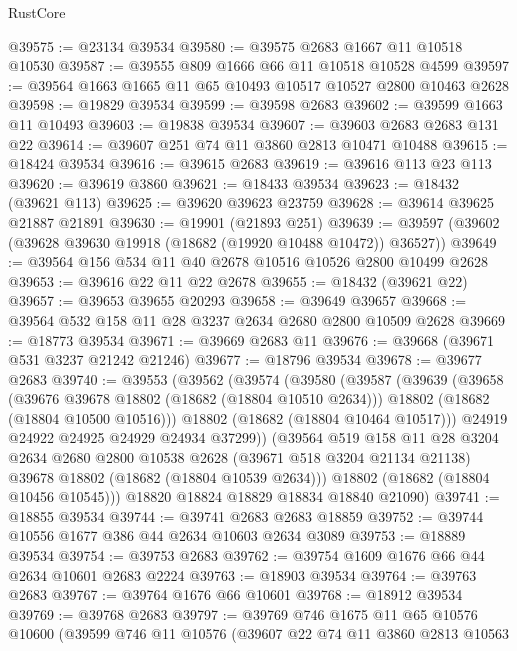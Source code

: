 \begin{lexlean}{RustCore}
\begin{coremodule}
@39575 := @23134 @39534
@39580 := @39575 @2683 @1667 @11 @10518 @10530
@39587 := @39555 @809 @1666 @66 @11 @10518 @10528 @4599
@39597 := @39564 @1663 @1665 @11 @65 @10493 @10517 @10527 @2800 @10463 @2628
@39598 := @19829 @39534
@39599 := @39598 @2683
@39602 := @39599 @1663 @11 @10493
@39603 := @19838 @39534
@39607 := @39603 @2683 @2683 @131 @22
@39614 := @39607 @251 @74 @11 @3860 @2813 @10471 @10488
@39615 := @18424 @39534
@39616 := @39615 @2683
@39619 := @39616 @113 @23 @113
@39620 := @39619 @3860
@39621 := @18433 @39534
@39623 := @18432 (@39621 @113)
@39625 := @39620 @39623 @23759
@39628 := @39614 @39625 @21887 @21891
@39630 := @19901 (@21893 @251)
@39639 := @39597 (@39602 (@39628 @39630 @19918 (@18682 (@19920 @10488 @10472)) @36527))
@39649 := @39564 @156 @534 @11 @40 @2678 @10516 @10526 @2800 @10499 @2628
@39653 := @39616 @22 @11 @22 @2678
@39655 := @18432 (@39621 @22)
@39657 := @39653 @39655 @20293
@39658 := @39649 @39657
@39668 := @39564 @532 @158 @11 @28 @3237 @2634 @2680 @2800 @10509 @2628
@39669 := @18773 @39534
@39671 := @39669 @2683 @11
@39676 := @39668 (@39671 @531 @3237 @21242 @21246)
@39677 := @18796 @39534
@39678 := @39677 @2683
@39740 := @39553
    (@39562
      (@39574
        (@39580
          (@39587
            (@39639
              (@39658
                (@39676 @39678 @18802 (@18682 (@18804 @10510 @2634)))
                @18802
                (@18682 (@18804 @10500 @10516)))
              @18802
              (@18682 (@18804 @10464 @10517)))
            @24919
            @24922
            @24925
            @24929
            @24934
            @37299))
        (@39564
          @519
          @158
          @11
          @28
          @3204
          @2634
          @2680
          @2800
          @10538
          @2628
          (@39671 @518 @3204 @21134 @21138)
          @39678
          @18802
          (@18682 (@18804 @10539 @2634)))
        @18802
        (@18682 (@18804 @10456 @10545)))
      @18820
      @18824
      @18829
      @18834
      @18840
      @21090)
@39741 := @18855 @39534
@39744 := @39741 @2683 @2683 @18859
@39752 := @39744 @10556 @1677 @386 @44 @2634 @10603 @2634 @3089
@39753 := @18889 @39534
@39754 := @39753 @2683
@39762 := @39754 @1609 @1676 @66 @44 @2634 @10601 @2683 @2224
@39763 := @18903 @39534
@39764 := @39763 @2683
@39767 := @39764 @1676 @66 @10601
@39768 := @18912 @39534
@39769 := @39768 @2683
@39797 := @39769
    @746
    @1675
    @11
    @65
    @10576
    @10600
    (@39599
      @746
      @11
      @10576
      (@39607
        @22
        @74
        @11
        @3860
        @2813
        @10563

\end{coremodule}
\end{lexlean}
